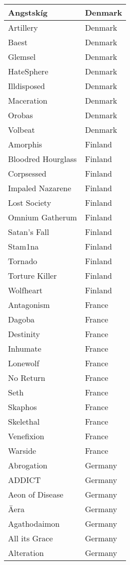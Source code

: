 \documentclass[12pt, a4paper, twoside]{report}
\begin{document}
\begin{center}
\begin{longtable}{|p{5cm}|p{5cm}|}
Angstskíg & Denmark \\ \hline
Artillery & Denmark \\ \hline
Baest & Denmark \\ \hline
Glemsel & Denmark \\ \hline
HateSphere & Denmark \\ \hline
Illdisposed & Denmark \\ \hline
Maceration & Denmark \\ \hline
Orobas & Denmark \\ \hline
Volbeat & Denmark \\ \hline
Amorphis & Finland \\ \hline
Bloodred Hourglass & Finland \\ \hline
Corpsessed & Finland \\ \hline
Impaled Nazarene & Finland \\ \hline
Lost Society & Finland \\ \hline
Omnium Gatherum & Finland \\ \hline
Satan's Fall & Finland \\ \hline
Stam1na & Finland \\ \hline
Tornado & Finland \\ \hline
Torture Killer & Finland \\ \hline
Wolfheart & Finland \\ \hline
Antagonism & France \\ \hline
Dagoba & France \\ \hline
Destinity & France \\ \hline
Inhumate & France \\ \hline
Lonewolf & France \\ \hline
No Return & France \\ \hline
Seth & France \\ \hline
Skaphos & France \\ \hline
Skelethal & France \\ \hline
Venefixion & France \\ \hline
Warside & France \\ \hline
Abrogation & Germany \\ \hline
ADDICT & Germany \\ \hline
Aeon of Disease & Germany \\ \hline
Äera & Germany \\ \hline
Agathodaimon & Germany \\ \hline
All its Grace & Germany \\ \hline
Alteration & Germany \\ \hline

\end{longtable}
\end{center}
\end{document}
